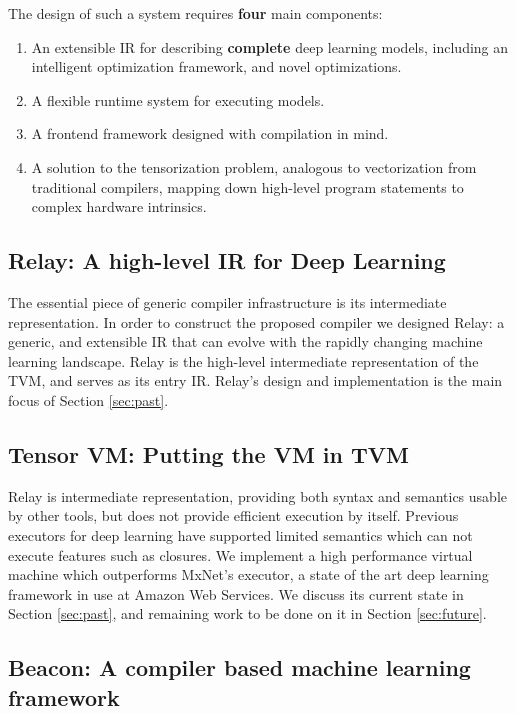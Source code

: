 The design of such a system requires \textbf{four} main components:
\begin{enumerate}
  \item An extensible IR for describing \textbf{complete} deep learning models,
        including an intelligent optimization framework, and novel optimizations.
  \item A flexible runtime system for executing models.
  \item A frontend framework designed with compilation in mind.
  \item A solution to the tensorization problem, analogous to vectorization from traditional
        compilers, mapping down high-level program statements to complex hardware intrinsics.
\end{enumerate}

\subsection{Relay: A high-level IR for Deep Learning}

The essential piece of generic compiler infrastructure is
  its intermediate representation.
In order to construct the proposed compiler we designed Relay: a generic, and
  extensible IR that can evolve with the rapidly changing
  machine learning landscape.
Relay is the high-level intermediate representation of the TVM,
  and serves as its entry IR.
Relay's design and implementation is the main focus of Section \ref{sec:past}.

\subsection{Tensor VM: Putting the VM in TVM}

Relay is intermediate representation, providing both
  syntax and semantics usable by other tools, but
  does not provide efficient execution by itself.
Previous executors for deep learning have supported
  limited semantics which can not execute features such as closures.
We implement a high performance virtual machine which
  outperforms MxNet's executor, a state of the art deep
  learning framework in use at Amazon Web Services.
We discuss its current state in Section \ref{sec:past},
  and remaining work to be done on it in Section \ref{sec:future}.

\subsection{Beacon: A compiler based machine learning framework}

